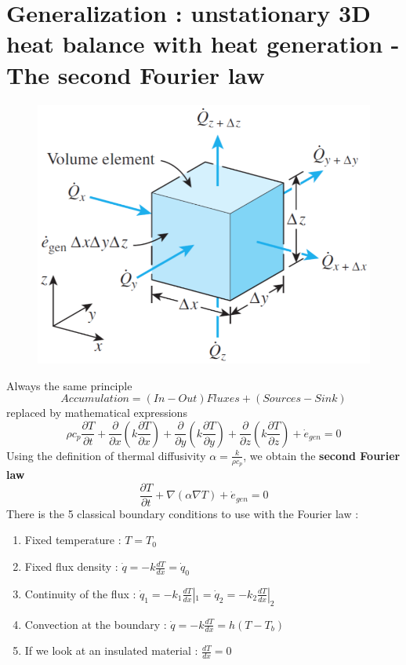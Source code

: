 \section{Generalization : unstationary 3D heat balance with heat generation - The second Fourier law}
	\begin{figure}
	\vspace{-10mm}
	\includegraphics[scale=0.4]{ch3/13}
	\end{figure}	
	Always the same principle
	\begin{equation}
		Accumulation = (In - Out) Fluxes + (Sources - Sink)
	\end{equation}		
	replaced by mathematical expressions
	\begin{equation}
		\rho c_p\frac{\partial T}{\partial t} + \frac{\partial}{\partial x} \left( k \frac{\partial T}{\partial x} \right) + \frac{\partial}{\partial y} \left( k \frac{\partial T}{\partial y} \right) + \frac{\partial}{\partial z} \left( k \frac{\partial T}{\partial z} \right) + \dot{e}_{gen} = 0
	\end{equation}
	Using the definition of thermal diffusivity $\alpha = \frac{k}{\rho c_p}$, we obtain the \textbf{second Fourier law}
	\begin{equation}
		\frac{\partial T}{\partial t} + \nabla (\alpha \nabla T) + \dot{e}_{gen} = 0 
	\end{equation}
	There is the 5 classical boundary conditions to use with the Fourier law : 
	\begin{enumerate}
		\item Fixed temperature : $T = T_0$
		\item Fixed flux density : $\dot{q} = -k \frac{dT}{dx} = \dot{q}_0$
		\item Continuity of the flux : $\dot{q}_1 = -k_1\frac{dT}{dx}|_1 = \dot{q}_2 = -k_2\frac{dT}{dx}|_2$
		\item Convection at the boundary : $\dot{q} = -k\frac{dT}{dx} = h(T-T_b)$
		\item If we look at an insulated material : $\frac{dT}{dx} = 0 $
	\end{enumerate}
	
	